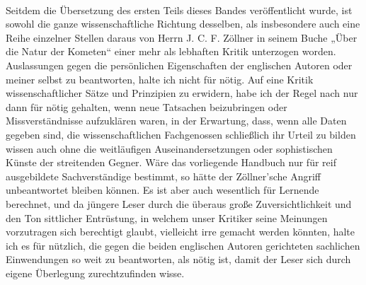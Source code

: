 \documentclass[a4paper, 11pt, oneside, german]{article}
\begin{document}
\paragraph{}
Seitdem die Übersetzung des ersten Teils dieses Bandes veröffentlicht wurde, ist sowohl die ganze wissenschaftliche Richtung desselben, als insbesondere auch eine Reihe einzelner Stellen daraus von Herrn J. C. F. Zöllner in seinem Buche „Über die Natur der Kometen“ einer mehr als lebhaften Kritik unterzogen worden. Auslassungen gegen die persönlichen Eigenschaften der englischen Autoren oder meiner selbst zu beantworten, halte ich nicht für nötig. Auf eine Kritik wissenschaftlicher Sätze und Prinzipien zu erwidern, habe ich der Regel nach nur dann für nötig gehalten, wenn neue Tatsachen beizubringen oder Missverständnisse aufzuklären waren, in der Erwartung, dass, wenn alle Daten gegeben sind, die wissenschaftlichen Fachgenossen schließlich ihr Urteil zu bilden wissen auch ohne die weitläufigen Auseinandersetzungen oder sophistischen Künste der streitenden Gegner. Wäre das vorliegende Handbuch nur für reif ausgebildete Sachverständige bestimmt, so hätte der Zöllner'sche Angriff unbeantwortet bleiben können. Es ist aber auch wesentlich für Lernende berechnet, und da jüngere Leser durch die überaus große Zuversichtlichkeit und den Ton sittlicher Entrüstung, in welchem unser Kritiker seine Meinungen vorzutragen sich berechtigt glaubt, vielleicht irre gemacht werden könnten, halte ich es für nützlich, die gegen die beiden englischen Autoren gerichteten sachlichen Einwendungen so weit zu beantworten, als nötig ist, damit der Leser sich durch eigene Überlegung zurechtzufinden wisse.
\end{document}
